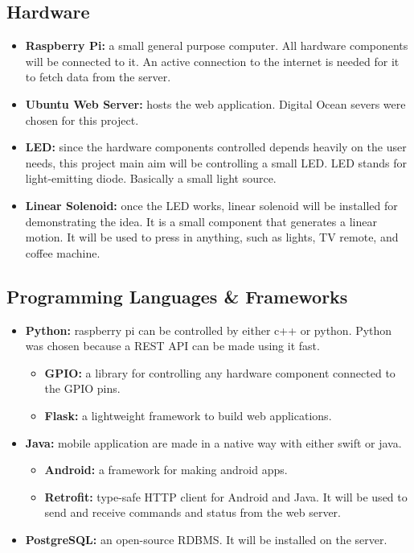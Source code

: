 \documentclass[12pt, oneside, a4paper]{book}
\newcommand\boldcolor[1]{\textcolor{bold}{\textbf{#1}}}
\begin{document}
			\subsection{Hardware}
				\begin{itemize}
				\item \boldcolor{Raspberry Pi:} a small general purpose computer. All hardware components will be connected to it. An active connection to the internet is needed for it to fetch data from the server\cite{raspberry}. %
				\item \boldcolor{Ubuntu Web Server:} hosts the web application. Digital Ocean severs\cite{digital_ocean} were chosen for this project.
				
				\item \boldcolor{LED:} since the hardware components controlled depends heavily on the user needs, this project main aim will be controlling a small LED. LED stands for light-emitting diode\cite{led}. Basically a small light source. %
				\item \boldcolor{Linear Solenoid:} once the LED works, linear solenoid will be installed for demonstrating the idea\cite{linear}. It is a small component that generates a linear motion. It will be used to press in anything, such as lights, TV remote, and coffee machine. %
				\end{itemize}
				
			\subsection{Programming Languages \& Frameworks}
				\begin{itemize}
					
					\item \boldcolor{Python:} raspberry pi can be controlled by either c++ or python. Python was chosen because a REST API can be made using it fast.
		 				\begin{itemize}
		 					\item \textbf{GPIO:} a library for controlling any hardware component connected to the GPIO pins\cite{gpio}.
		 					\item \textbf{Flask:} a lightweight framework to build web applications\cite{flask}.
						\end{itemize}
					\item \boldcolor{Java:} mobile application are made in a native way with either swift or java.
						\begin{itemize}
							\item \textbf{Android:} a framework for making android apps.
							\item \textbf{Retrofit:} type-safe HTTP client for Android and Java\cite{retro}. It will be used to send and receive commands and status from the web server.
							
						\end{itemize}
					\item \boldcolor{PostgreSQL:} an open-source RDBMS\cite{postgres}. It will be installed on the server.
				\end{itemize}
			
\end{document}

